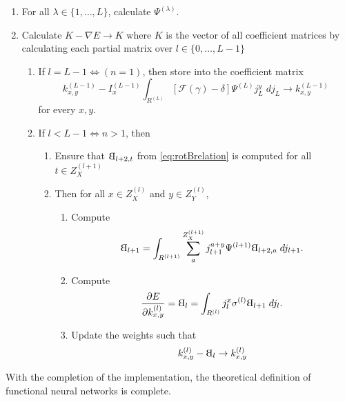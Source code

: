 \begin{enumerate}
\item For all $\lambda \in \{ 1,\dots, L \}$, calculate $\Psi^{(\lambda)}$.

\item Calculate $K - \nabla E \to K$ where $K$ is the vector of all coefficient matrices by calculating each partial matrix over $l \in \{0,\dots, L-1\}$

  \begin{enumerate}
  \item If $l = L - 1 \Leftrightarrow (n = 1)$, then store into the coefficient matrix
    \begin{equation}
       k_{x,y}^{(L-1)} - I_x^{(L-1)}
        \int_{R^{(L)}} \left[\mathcal{F}(\gamma) - \delta\right] 
          \Psi^{(L)} j_L^y \; dj_L \to  k_{x,y}^{(L-1)}
    \end{equation}
    for every $x,y.$
    

    \item  If $l < L - 1 \Leftrightarrow n > 1$, then
    \begin{enumerate}
      \item Ensure that $\rotB_{l+2,t}$ from \eqref{eq:rotBrelation} is computed for all $t \in Z^{(l+1)}_X$

      \item Then for all $x\in Z^{(l)}_X$ and $y\in Z^{(l)}_Y$,
      \begin{enumerate}

        \item Compute
          \begin{equation}
           \rotB_{l+1} = \int_{R^{(l+1)}} \sum_a^{Z^{(l+1)}_X}
             j^{a+y}_{l+1} \Psi^{(l+1)} \rotB_{l+2, a}\; dj_{l+1}. 
          \end{equation}

        \item Compute 
        \begin{equation}
           \frac{\partial E}{\partial k^{(l)}_{x,y}} = \rotB_{l} = \int_{R^{(l)}}
            j_{l}^x \sigma^{(l)} \rotB_{l+1}\; dj_l.
        \end{equation}
      
        \item Update the weights such that 
        \begin{equation}
          k_{x,y}^{(l)} - \rotB_l \to k_{x,y}^{(l)}
        \end{equation}
      \end{enumerate}
    \end{enumerate}
  \end{enumerate}
\end{enumerate}

With the completion of the implementation, the theoretical definition of functional neural networks is complete.